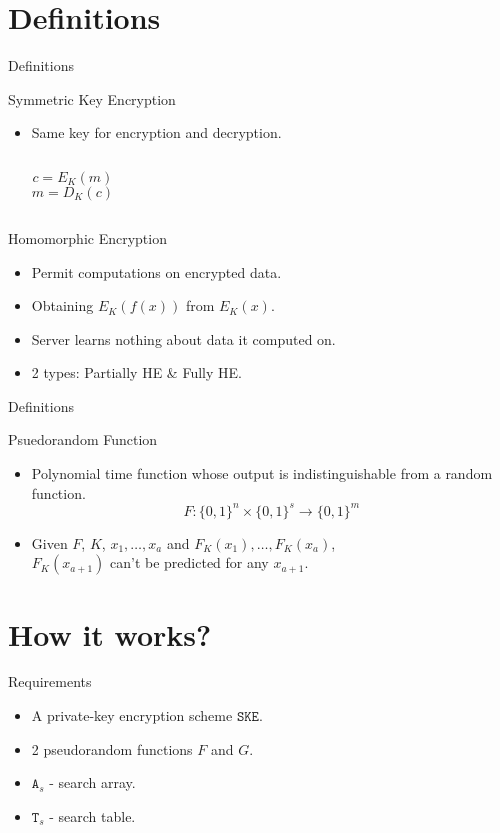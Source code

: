 \documentclass{beamer}
\begin{document}
\section{Definitions}
\begin{frame}{Definitions}

\begin{block}{Symmetric Key Encryption}
\begin{itemize}
\item Same key for encryption and decryption.
\begin{columns}
	\[c = E_K(m)\]
	\[m = D_K(c)\]
\end{columns}
\end{itemize}
\end{block}

\begin{block}{Homomorphic Encryption}
\begin{itemize}
\item Permit computations on encrypted data.
\item Obtaining \(E_K(f(x))\) from \(E_K(x)\).
\item Server learns nothing about data it computed on.
\item 2 types: Partially HE \& Fully HE.
\end{itemize}
\end{block}

\end{frame}

\begin{frame}{Definitions}
\begin{block}{Psuedorandom Function}
\begin{itemize}
\item Polynomial time function whose output is indistinguishable from a
random function.
\[F \colon \{0,1\}^n \times \{0,1\}^s \rightarrow \{0,1\}^m\]
\item Given \(F\), \(K\), \(x_1, \dotsc, x_a\) and
	\(F_K(x_1),\dotsc,F_K(x_a)\), \\ \(F_K(x_{a+1})\) can't be predicted for any \(x_{a+1}\).
\end{itemize}
\end{block}
\end{frame}


\section{How it works?}
\begin{frame}{Requirements}
\begin{itemize}
\item A private-key encryption scheme \(\mathtt{SKE}\).
\item 2 pseudorandom functions \(F\) and \(G\).
\item \(\mathtt{A}_s\) - search array.
\item \(\mathtt{T}_s\) - search table.
\end{itemize}
\end{frame}
\end{document}
